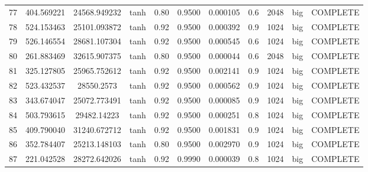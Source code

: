 \begin{longtable}{ccccccccccc}
                       77 &                 404.569221 &                       24568.949232 &            tanh &        0.80 & 0.9500 &       0.000105 &             0.6 &     2048 &       big & COMPLETE \\
                       78 &                 524.153463 &                       25101.093872 &            tanh &        0.92 & 0.9500 &       0.000392 &             0.9 &     1024 &       big & COMPLETE \\
                       79 &                 526.146554 &                       28681.107304 &            tanh &        0.92 & 0.9500 &       0.000545 &             0.6 &     1024 &       big & COMPLETE \\
                       80 &                 261.883469 &                       32615.907375 &            tanh &        0.80 & 0.9500 &       0.000044 &             0.6 &     2048 &       big & COMPLETE \\
                       81 &                 325.127805 &                       25965.752612 &            tanh &        0.92 & 0.9500 &       0.002141 &             0.9 &     1024 &       big & COMPLETE \\
                       82 &                 523.432537 &                         28550.2573 &            tanh &        0.92 & 0.9500 &       0.000562 &             0.9 &     1024 &       big & COMPLETE \\
                       83 &                 343.674047 &                       25072.773491 &            tanh &        0.92 & 0.9500 &       0.000085 &             0.9 &     1024 &       big & COMPLETE \\
                       84 &                 503.793615 &                        29482.14223 &            tanh &        0.92 & 0.9500 &       0.000251 &             0.8 &     1024 &       big & COMPLETE \\
                       85 &                 409.790040 &                       31240.672712 &            tanh &        0.92 & 0.9500 &       0.001831 &             0.9 &     1024 &       big & COMPLETE \\
                       86 &                 352.784407 &                       25213.148103 &            tanh &        0.80 & 0.9500 &       0.002970 &             0.9 &     1024 &       big & COMPLETE \\
                       87 &                 221.042528 &                       28272.642026 &            tanh &        0.92 & 0.9990 &       0.000039 &             0.8 &     1024 &       big & COMPLETE \\

\end{longtable}
